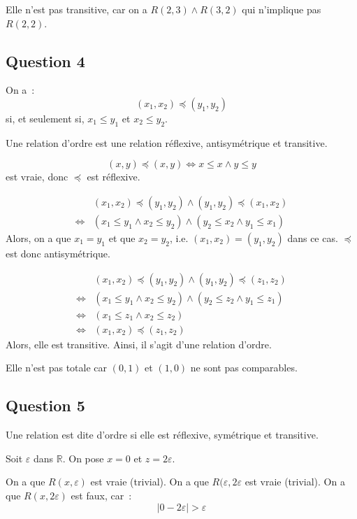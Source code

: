 \documentclass[a4paper]{article}
\begin{document}
    Elle n'est pas transitive, car on a $R(2,3) \land R(3,2)$ qui n'implique pas $R(2,2)$.
    \subsection*{Question 4}
    On a~:
    $$ (x_1,x_2) \preceq (y_1,y_2) $$
    si, et seulement si, $x_1\leqslant y_1$ et $x_2\leqslant y_2$.

    Une relation d'ordre est une relation réflexive, antisymétrique et transitive.

    $$ (x,y)\preceq (x,y) \iff x\leqslant x \land y \leqslant y  $$
    est vraie, donc $\preceq$ est réflexive.

    \begin{align*}
        & (x_1,x_2) \preceq (y_1,y_2) \land (y_1,y_2) \preceq (x_1,x_2)\\
        \iff & (x_1 \leqslant y_1 \land x_2\leqslant y_2) \land (y_2 \leqslant x_2 \land y_1\leqslant x_1)
    \end{align*}
    Alors, on a que $x_1=y_1$ et que $x_2=y_2$, i.e. $(x_1,x_2)=(y_1,y_2)$ dans ce cas.
    $\preceq$ est donc antisymétrique.

    \begin{align*}
        & (x_1,x_2) \preceq (y_1,y_2) \land (y_1,y_2) \preceq (z_1,z_2)\\
        \iff & (x_1 \leqslant y_1 \land x_2\leqslant y_2) \land (y_2 \leqslant z_2 \land y_1\leqslant z_1) \\
        \iff & (x_1 \leqslant z_1 \land x_2\leqslant z_2) \\
        \iff & (x_1,x_2)\preceq (z_1,z_2) 
    \end{align*}
    Alors, elle est transitive.
    Ainsi, il s'agit d'une relation d'ordre.

    Elle n'est pas totale car $(0,1)$ et $(1,0)$ ne sont pas comparables.
    \subsection*{Question 5}
    Une relation est dite d'ordre si elle est réflexive, symétrique et transitive.

    Soit $\varepsilon$ dans $\mathbb{R}$.
    On pose $x = 0$ et $z = 2\varepsilon$.

    On a que $R(x,\varepsilon)$ est vraie (trivial).
    On a que $R(\varepsilon, 2\varepsilon$ est vraie (trivial).
    On a que $R(x,2\varepsilon)$ est faux, car~:
    $$ |0-2\varepsilon| > \varepsilon $$
\end{document}

